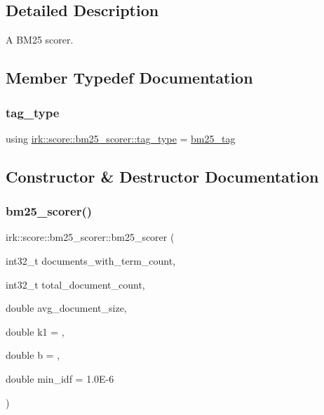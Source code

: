 \subsection{Detailed Description}
A B\+M25 scorer. 

\subsection{Member Typedef Documentation}
\mbox{\label{structirk_1_1score_1_1bm25__scorer_ab99e02fc9ede9441ad9ee7a99077a720}} 
\subsubsection{\texorpdfstring{tag\+\_\+type}{tag\_type}}
{\footnotesize\ttfamily using \mbox{\hyperlink{structirk_1_1score_1_1bm25__scorer_ab99e02fc9ede9441ad9ee7a99077a720}{irk\+::score\+::bm25\+\_\+scorer\+::tag\+\_\+type}} =  \mbox{\hyperlink{structirk_1_1score_1_1bm25__tag}{bm25\+\_\+tag}}}



\subsection{Constructor \& Destructor Documentation}
\mbox{\label{structirk_1_1score_1_1bm25__scorer_a71a44472ad2392f2d6bb936369e4df0f}} 
\subsubsection{\texorpdfstring{bm25\+\_\+scorer()}{bm25\_scorer()}}
{\footnotesize\ttfamily irk\+::score\+::bm25\+\_\+scorer\+::bm25\+\_\+scorer (\begin{DoxyParamCaption}\item[{int32\+\_\+t}]{documents\+\_\+with\+\_\+term\+\_\+count,  }\item[{int32\+\_\+t}]{total\+\_\+document\+\_\+count,  }\item[{double}]{avg\+\_\+document\+\_\+size,  }\item[{double}]{k1 = {},  }\item[{double}]{b = {},  }\item[{double}]{min\+\_\+idf = {\ttfamily 1.0E-\/6} }\end{DoxyParamCaption})\hspace{0.3cm}{\ttfamily [inline]}}



